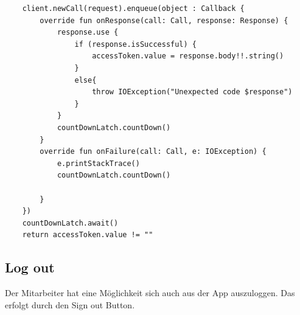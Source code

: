 \begin{lstlisting}
    client.newCall(request).enqueue(object : Callback {
        override fun onResponse(call: Call, response: Response) {
            response.use {
                if (response.isSuccessful) {
                    accessToken.value = response.body!!.string()
                }
                else{
                    throw IOException("Unexpected code $response")
                }
            }
            countDownLatch.countDown()
        }
        override fun onFailure(call: Call, e: IOException) {
            e.printStackTrace()
            countDownLatch.countDown()

        }
    })
    countDownLatch.await()
    return accessToken.value != ""
\end{lstlisting}

\subsection{Log out}
Der Mitarbeiter hat eine Möglichkeit sich auch aus der App auszuloggen. Das erfolgt durch den Sign out Button.
